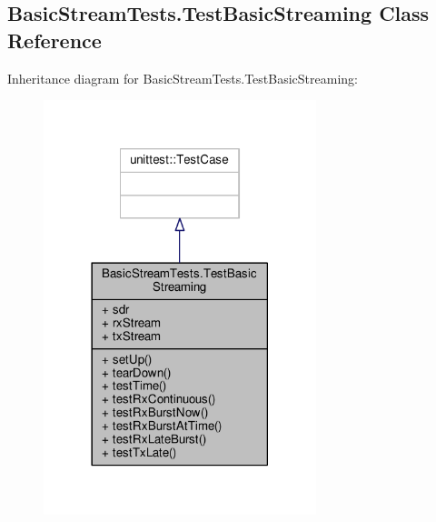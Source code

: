 \subsection{Basic\+Stream\+Tests.\+Test\+Basic\+Streaming Class Reference}
\label{classBasicStreamTests_1_1TestBasicStreaming}


Inheritance diagram for Basic\+Stream\+Tests.\+Test\+Basic\+Streaming\+:
\nopagebreak
\begin{figure}[H]
\begin{center}
\leavevmode
\includegraphics[width=225pt]{d6/d59/classBasicStreamTests_1_1TestBasicStreaming__inherit__graph}
\end{center}
\end{figure}


